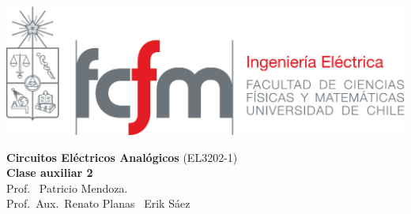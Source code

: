 \documentclass[
  11pt,
  letterpaper,
   addpoints,
  ]{exam}
\begin{document}
\noindent
\begin{minipage}{0.47\textwidth}
\includegraphics[width=\textwidth]{../fcfm_die}
\end{minipage}
\begin{minipage}{0.53\textwidth}
\begin{center} 
\large\textbf{Circuitos Eléctricos Analógicos} (EL3202-1) \\
\large\textbf{Clase auxiliar 2} \\
\normalsize Prof.~ Patricio Mendoza.\\
\normalsize Prof.~Aux.~Renato Planas ~Erik Sáez
\end{center}
\end{minipage}

\vspace{0.5cm}
\noindent
\vspace{.85cm}
\end{document}
